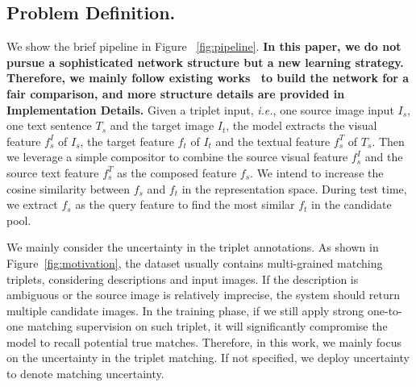 \documentclass[10pt,twocolumn,letterpaper]{article}
\def\ie{\emph{i.e.}}
\begin{document}
\subsection{Problem Definition.} 
We show the brief pipeline in Figure ~\ref{fig:pipeline}. \textbf{In this paper, we do not pursue a sophisticated network structure but a new learning strategy. Therefore, we mainly follow existing works~\cite{2021CoSMo,Chen_2020_CVPR} to build the network for a fair comparison, and more structure details are provided in Implementation Details.} Given a triplet input, \ie, one source image input $I_s$, one text sentence $T_s$ and the target image $I_t$, the model extracts the visual feature $f^I_s$ of $I_s$, the target feature $f_t$ of $I_t$ and the textual feature  $f^T_s$ of $T_s$. Then we leverage a simple compositor to combine the source visual feature $f^I_s$ and the source text feature $f^T_s$ as the composed feature $f_s$.
We intend to increase the cosine similarity between $f_s$ and $f_t$ in the representation space.
During test time, we extract $f_s$ as the query feature to find the most similar $f_t$ in the candidate pool.  

We mainly consider the uncertainty in the triplet annotations. As shown in Figure~\ref{fig:motivation}, the dataset usually contains multi-grained matching triplets, considering descriptions and input images. 
If the description is ambiguous or the source image is relatively imprecise, the system should return multiple candidate images. 
In the training phase, if we still apply strong one-to-one matching supervision on such triplet, it will significantly compromise the model to recall potential true matches. 
Therefore, in this work, we mainly focus on the uncertainty in the triplet matching. If not specified, we deploy uncertainty to denote matching uncertainty.
\end{document}
